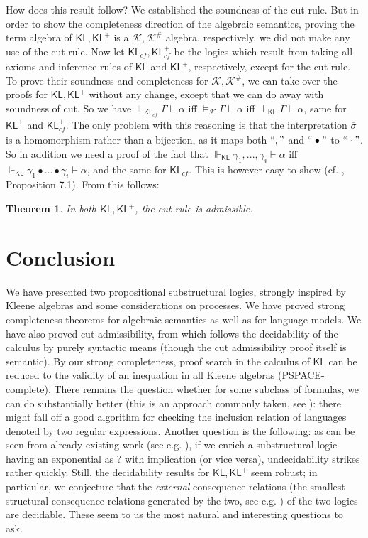 \documentclass{eptcs}
\newtheorem{thm}[defn]{Theorem}
\newcommand{\KA}{\mathcal{K}}
\newcommand{\osigma}{\overline{\sigma}}
\newcommand{\KL}{\mathsf{KL}}
\begin{document}
How does this result follow? We established the
soundness of the cut rule. But in order to show the completeness
direction of the algebraic semantics, proving the term 
algebra of $\KL,\KL^+$ is a $\KA,\KA^\#$ algebra, respectively, 
we did not make any use of the cut rule. 
Now let $\KL_{\mathit{cf}},\KL^+_{\mathit{cf}}$ be the logics which 
result from taking all axioms and inference 
rules of $\KL$ and $\KL^+$, respectively,
except for the cut rule. To prove their soundness and completeness for 
$\KA,\KA^\#$, we can take over the proofs for $\KL,\KL^+$ without
any change, except that we can do away with soundness of cut. 
So we have $\Vdash_{\KL_{\mathit{cf}}}\Gamma\vdash\alpha$ 
iff $\models_{\KA}\Gamma\vdash\alpha$ iff $\Vdash_{\KL}\Gamma\vdash\alpha$,
same for $\KL^+$ and $\KL^+_{\mathit{cf}}$. The only problem with this reasoning
is that the interpretation $\osigma$ is a homomorphism rather than a
bijection, as it maps both $``,"$ and $``\bullet"$ to $``\cdot"$. So
in addition we need a proof of the fact that 
$\Vdash_{\KL}\gamma_1,...,\gamma_i\vdash\alpha$ iff 
$\Vdash_{\KL}\gamma_1\bullet...\bullet\gamma_i\vdash\alpha$, and the
same for $\KL_{\mathit{cf}}$. This is however easy to show (cf. \cite{galatos:residuated},
Proposition 7.1). From this follows: 


\begin{thm}
In both $\KL,\KL^+$, the cut rule is admissible.
\end{thm}




\section{Conclusion}

We have presented two propositional substructural logics,
strongly inspired by Kleene algebras and 
some considerations on processes. We have proved strong completeness 
theorems for algebraic semantics as well
as for language models. We have also
proved cut admissibility, from which follows the decidability of the
calculus by purely syntactic means (though the cut admissibility
proof itself is semantic). 
By our strong completeness, proof search in the calculus of $\KL$
can be reduced to the validity of an inequation in all Kleene algebras
(PSPACE-complete). There remains
the question whether for some subclass 
of formulas, we can do substantially better
(this is an approach commonly taken, see \cite{hovland:inclusion}): 
there might fall off a good 
algorithm for checking the inclusion relation
of languages denoted by two regular expressions.
Another question is the following: as can be seen from already
existing work (see e.g. \cite{buszkowski:action}), if we enrich
a substructural logic having an exponential as $?$ with implication
(or vice versa), undecidability strikes rather quickly. Still,
the decidability results for $\KL,\KL^+$ seem robust;	 
in particular, 
we conjecture that the \textit{external} consequence
relations (the smallest structural consequence relations generated
by the two, see e.g. \cite{galatos:residuated}) 
of the two logics are decidable.
These seem to us the most natural and
interesting questions to ask. 



\end{document}
